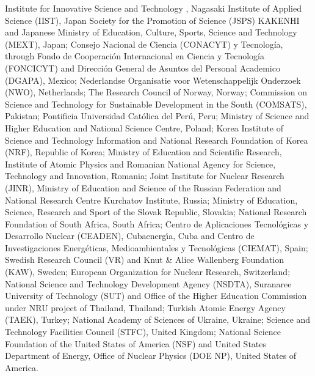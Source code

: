 %
Institute for Innovative Science and Technology , Nagasaki Institute of Applied Science (IIST), Japan Society for the Promotion of Science (JSPS) KAKENHI and Japanese Ministry of Education, Culture, Sports, Science and Technology (MEXT), Japan;
%
Consejo Nacional de Ciencia (CONACYT) y Tecnolog\'{i}a, through Fondo de Cooperaci\'{o}n Internacional en Ciencia y Tecnolog\'{i}a (FONCICYT) and Direcci\'{o}n General de Asuntos del Personal Academico (DGAPA), Mexico;
%
Nederlandse Organisatie voor Wetenschappelijk Onderzoek (NWO), Netherlands;
%
The Research Council of Norway, Norway;
%
Commission on Science and Technology for Sustainable Development in the South (COMSATS), Pakistan;
%
Pontificia Universidad Cat\'{o}lica del Per\'{u}, Peru;
%
Ministry of Science and Higher Education and National Science Centre, Poland;
%
Korea Institute of Science and Technology Information and National Research Foundation of Korea (NRF), Republic of Korea;
%
Ministry of Education and Scientific Research, Institute of Atomic Physics and Romanian National Agency for Science, Technology and Innovation, Romania;
%
Joint Institute for Nuclear Research (JINR), Ministry of Education and Science of the Russian Federation and National Research Centre Kurchatov Institute, Russia;
%
Ministry of Education, Science, Research and Sport of the Slovak Republic, Slovakia;
%
National Research Foundation of South Africa, South Africa;
%
Centro de Aplicaciones Tecnol\'{o}gicas y Desarrollo Nuclear (CEADEN), Cubaenerg\'{\i}a, Cuba and Centro de Investigaciones Energ\'{e}ticas, Medioambientales y Tecnol\'{o}gicas (CIEMAT), Spain;
%
Swedish Research Council (VR) and Knut \& Alice Wallenberg Foundation (KAW), Sweden;
%
European Organization for Nuclear Research, Switzerland;
%
National Science and Technology Development Agency (NSDTA), Suranaree University of Technology (SUT) and Office of the Higher Education Commission under NRU project of Thailand, Thailand;
%
Turkish Atomic Energy Agency (TAEK), Turkey;
%
National Academy of  Sciences of Ukraine, Ukraine;
%
Science and Technology Facilities Council (STFC), United Kingdom;
%
National Science Foundation of the United States of America (NSF) and United States Department of Energy, Office of Nuclear Physics (DOE NP), United States of America.